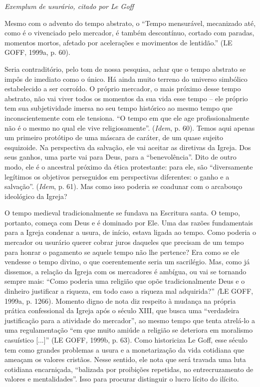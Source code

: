 \emph{Exemplum} \emph{de usurário, citado por Le Goff}

Mesmo com o advento do tempo abstrato, o ``Tempo mensurável, mecanizado
até, como é o vivenciado pelo mercador, é também descontínuo, cortado
com paradas, momentos mortos, afetado por acelerações e movimentos de
lentidão.'' (LE GOFF, 1999a, p. 60).

Seria contraditório, pelo tom de nossa pesquisa, achar que o tempo
abstrato se impôs de imediato como o único. Há ainda muito terreno do
universo simbólico estabelecido a ser corroído. O próprio mercador, o
mais próximo desse tempo abstrato, não vai viver todos os momentos da
sua vida esse tempo -- ele próprio tem sua subjetividade imersa no seu
tempo histórico ao mesmo tempo que inconscientemente com ele tensiona.
``O tempo em que ele age profissionalmente não é o mesmo no qual ele
vive religiosamente''. (\emph{Idem}, p. 60). Temos aqui apenas um
primeiro protótipo de uma máscara de caráter, de um quase sujeito
esquizoide. Na perspectiva da salvação, ele vai aceitar as diretivas da
Igreja. Dos seus ganhos, uma parte vai para Deus, para a
``benevolência''. Dito de outro modo, ele é o ancestral próximo da ética
protestante: para ele, são ``diversamente legítimos os objetivos
perseguidos em perspectivas diferentes: o ganho e a salvação''.
(\emph{Idem}, p. 61). Mas como isso poderia se coadunar com o arcabouço
ideológico da Igreja?

O tempo medieval tradicionalmente se fundava na Escritura santa. O
tempo, portanto, começa com Deus e é dominado por Ele. Uma das razões
fundamentais para a Igreja condenar a usura, de início, estava ligada ao
tempo. Como poderia o mercador ou usurário querer cobrar juros daqueles
que precisam de um tempo para honrar o pagamento se aquele tempo não lhe
pertence? Era como se ele vendesse o tempo divino, o que coerentemente
seria um sacrilégio. Mas, como já dissemos, a relação da Igreja com os
mercadores é ambígua, ou vai se tornando sempre mais: ``Como poderia uma
religião que opõe tradicionalmente Deus e o dinheiro justificar a
riqueza, em todo caso a riqueza mal adquirida?'' \emph{(}LE GOFF, 1999a,
p. 1266)\emph{.} Momento digno de nota diz respeito à mudança na própria
prática confessional da Igreja após o século XIII, que busca uma
``verdadeira justificação para a atividade do mercador'', ao mesmo tempo
que tenta atrelá-lo a uma regulamentação ``em que muito amiúde a
religião se deteriora em moralismo casuístico {[}...{]}'' (LE
GOFF\emph{,} 1999b, p. 63). Como historiciza Le Goff, esse século tem
como grandes problemas a usura e a monetarização da vida cotidiana que
ameaçam os valores cristãos. Nesse sentido, ele nota que será travada
uma luta cotidiana encarniçada, ``balizada por proibições repetidas, no
entrecruzamento de valores e mentalidades''. Isso para procurar
distinguir o lucro lícito do ilícito.


